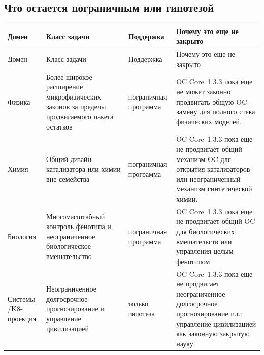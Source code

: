 \subsection{Что остается пограничным или гипотезой}
\begingroup
\scriptsize
\setlength{\emergencystretch}{1.5em}
\setlength{\tabcolsep}{2pt}
\setlength{\LTleft}{0pt}
\setlength{\LTright}{0pt}
\begin{longtable}{@{}L{0.11\textwidth}L{0.19\textwidth}L{0.14\textwidth}L{0.48\textwidth}@{}}
\toprule
Домен & Класс задачи & Поддержка & Почему это еще не закрыто \\
\midrule
\endfirsthead
\toprule
Домен & Класс задачи & Поддержка & Почему это еще не закрыто \\
\midrule
\endhead
Физика & Более широкое расширение микрофизических законов за пределы продвигаемого пакета остатков & пограничная программа & OC Core~1.3.3 пока еще не может законно продвигать общую OC-замену для полного стека физических моделей. \\
Химия & Общий дизайн катализатора или химии вне семейства & пограничная программа & OC Core~1.3.3 пока еще не продвигает общий механизм OC для открытия катализаторов или неограниченный механизм синтетической химии. \\
Биология & Многомасштабный контроль фенотипа и неограниченное биологическое вмешательство & пограничная программа & OC Core~1.3.3 пока еще не продвигает общий OC для биологических вмешательств или управления целым фенотипом. \\
Системы /\allowbreak K8-проекция & Неограниченное долгосрочное прогнозирование и управление цивилизацией & только гипотеза & OC Core~1.3.3 пока еще не продвигает неограниченное долгосрочное прогнозирование или управление цивилизацией как законную закрытую науку. \\
\bottomrule
\end{longtable}
\endgroup
